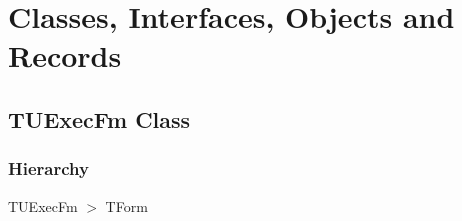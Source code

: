 \documentclass{report}
\newif\ifpdf
\begin{document}
\section{Classes, Interfaces, Objects and Records}
\ifpdf
\subsection*{\large{\textbf{TUExecFm Class}}\normalsize\hspace{1ex}\hrulefill}
\else
\subsection*{TUExecFm Class}
\fi
\label{updexec.TUExecFm}
\subsubsection*{\large{\textbf{Hierarchy}}\normalsize\hspace{1ex}\hfill}
TUExecFm {$>$} TForm
\end{document}
